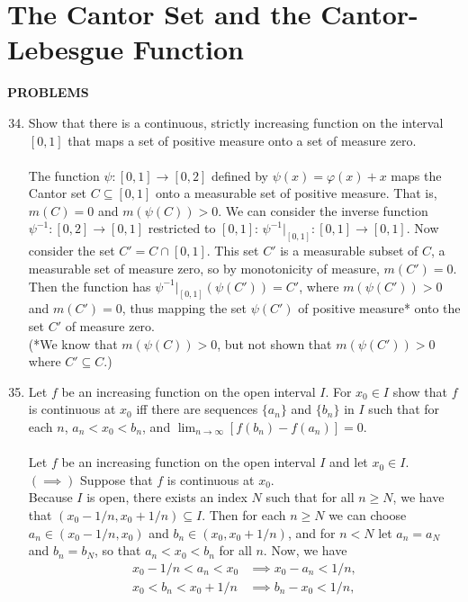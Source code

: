 \section{The Cantor Set and the Cantor-Lebesgue Function}
\begin{center}
	\textbf{PROBLEMS}
\end{center}
\begin{enumerate}
	\setcounter{enumi}{33}
	\item Show that there is a continuous, strictly increasing function on the interval $[0,1]$ that maps a set of positive measure onto a set of measure zero.\\
	\\The function $\psi:[0,1]\to[0,2]$ defined by $\psi(x)=\varphi(x)+x$ maps the Cantor set $C\subseteq[0,1]$ onto a measurable set of positive measure.
	That is, $m(C)=0$ and $m(\psi(C))>0$.
	We can consider the inverse function $\psi^{-1}:[0,2]\to[0,1]$ restricted to $[0,1]$: $\psi^{-1}|_{[0,1]}:[0,1]\to[0,1]$.
	Now consider the set $C'=C\cap[0,1]$. This set $C'$ is a measurable subset of $C$, a measurable set of measure zero, so by monotonicity of measure, $m(C')=0$.
	Then the function has $\psi^{-1}|_{[0,1]}(\psi(C'))=C'$, where $m(\psi(C'))>0$ and $m(C')=0$, thus mapping the set $\psi(C')$ of positive measure* onto the set $C'$ of measure zero.\\
	(*We know that  $m(\psi(C))>0$, but not shown that $m(\psi(C'))>0$ where $C'\subseteq C$.)
	\item Let $f$ be an increasing function on the open interval $I$. For $x_0\in I$ show that $f$ is continuous at $x_0$ iff there are sequences $\{a_n\}$ and $\{b_n\}$ in $I$ such that for each $n$, $a_n<x_0<b_n$, and $\lim_{n\to\infty}[f(b_n)-f(a_n)]=0$.\\
	\\Let $f$ be an increasing function on the open interval $I$ and let $x_0\in I$.\\
	$(\implies)$ Suppose that $f$ is continuous at $x_0$.\\
	Because $I$ is open, there exists an index $N$ such that for all $n\ge N$, we have that $(x_0-1/n,x_0+1/n)\subseteq I$.
	Then for each $n\ge N$ we can choose $a_n\in(x_0-1/n,x_0)$ and $b_n\in(x_0,x_0+1/n)$, and for $n<N$ let $a_n=a_N$ and $b_n=b_N$, so that $a_n<x_0<b_n$ for all $n$.
	Now, we have
	\begin{align*}
		x_0-1/n<a_n<x_0&\implies x_0-a_n<1/n,\\
		x_0<b_n<x_0+1/n&\implies b_n-x_0<1/n,
	\end{align*}

\end{enumerate}
